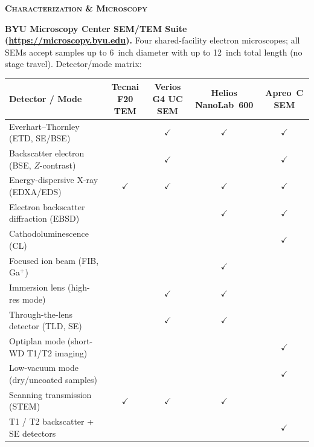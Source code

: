\documentclass[11pt,letterpaper]{article}
\begin{document}
\medskip\noindent\textbf{\textsc{Characterization \& Microscopy}}

\noindent
\textbf{BYU Microscopy Center SEM/TEM Suite
(\url{https://microscopy.byu.edu}).}
Four shared-facility electron microscopes; all SEMs accept samples up
to 6~inch diameter with up to 12~inch total length (no stage travel).
Detector/mode matrix:

\begin{center}\small
\begin{tabular}{@{}lcccc@{}}
\toprule
Detector / Mode & Tecnai F20 TEM & Verios G4 UC SEM & Helios NanoLab~600 & Apreo~C SEM \\
\midrule
Everhart--Thornley (ETD, SE/BSE)         &              & $\checkmark$ & $\checkmark$ & $\checkmark$ \\
Backscatter electron (BSE, $Z$-contrast) &              & $\checkmark$ &              & $\checkmark$ \\
Energy-dispersive X-ray (EDXA/EDS)       & $\checkmark$ & $\checkmark$ & $\checkmark$ & $\checkmark$ \\
Electron backscatter diffraction (EBSD)  &              &              & $\checkmark$ & $\checkmark$ \\
Cathodoluminescence (CL)                 &              &              &              & $\checkmark$ \\
Focused ion beam (FIB, Ga$^{+}$)         &              &              & $\checkmark$ &              \\
Immersion lens (high-res mode)           &              & $\checkmark$ & $\checkmark$ &              \\
Through-the-lens detector (TLD, SE)      &              & $\checkmark$ & $\checkmark$ &              \\
Optiplan mode (short-WD T1/T2 imaging)   &              &              &              & $\checkmark$ \\
Low-vacuum mode (dry/uncoated samples)   &              &              &              & $\checkmark$ \\
Scanning transmission (STEM)             & $\checkmark$ & $\checkmark$ & $\checkmark$ &              \\
T1 / T2 backscatter + SE detectors       &              &              &              & $\checkmark$ \\
\bottomrule
\end{tabular}
\end{center}
\end{document}
